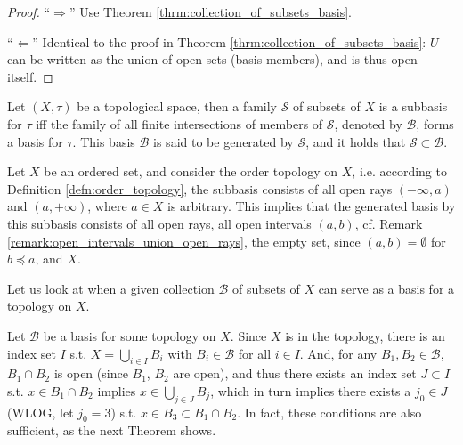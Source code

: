 \begin{proof}
	\enquote{$\Longrightarrow$} Use Theorem \ref{thrm:collection_of_subsets_basis}.
	
	\enquote{$\Longleftarrow$} Identical to the proof in Theorem \ref{thrm:collection_of_subsets_basis}: $U$ can be written as the union of open sets (basis members), and is thus open itself.
\end{proof}

\begin{remark}\label{remark:basis_gen_by_subbasis}
	Let $(X, \tau)$ be a topological space, then a family $\mathscr S$ of subsets of $X$ is a subbasis for $\tau$ iff the family of all finite intersections of members of $\mathscr S$, denoted by $\mathscr B$, forms a basis for $\tau$. This basis $\mathscr B$ is said to be generated by $\mathscr S$, and it holds that $\mathscr S \subset \mathscr B$.
\end{remark}

\begin{exmp}
	Let $X$ be an ordered set, and consider the order topology on $X$, i.e. according to Definition \ref{defn:order_topology}, the subbasis consists of all open rays $(-\infty, a)$ and $(a, +\infty)$, where $a\in X$ is arbitrary. This implies that the generated basis by this subbasis consists of all open rays, all open intervals $(a, b)$, cf. Remark \ref{remark:open_intervals_union_open_rays}, the empty set, since $(a, b) = \emptyset$ for $b\preceq a$, and $X$.
\end{exmp}

Let us look at when a given collection $\mathscr B$ of subsets of $X$ can serve as a basis for a topology on $X$.

\begin{remark}
	Let $\mathscr B$ be a basis for some topology on $X$. Since $X$ is in the topology, there is an index set $I$ s.t. $X = \bigcup_{i\in I}B_i$ with $B_i\in\mathscr B$ for all $i\in I$. And, for any $B_1, B_2\in\mathscr B$, $B_1\cap B_2$ is open (since $B_1$, $B_2$ are open), and thus there exists an index set $J\subset I$ s.t. $x\in B_1\cap B_2$ implies $x\in \bigcup_{j\in J}B_j$, which in turn implies there exists a $j_0 \in J$ (WLOG, let $j_0 = 3$) s.t. $x\in B_3\subset B_1\cap B_2$. In fact, these conditions are also sufficient, as the next Theorem shows.
\end{remark}


